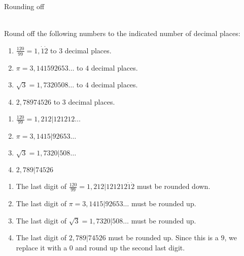 \begin{wex}{Rounding off }

{
\begin{minipage}{\textwidth}\\
Round off the following numbers to the indicated number of decimal places: 
\begin{enumerate}[itemsep=5pt, label=\textbf{\arabic*}. ] 

\item $\frac{120}{99}=1,\dot{1}\dot{2}$ to $3$ decimal places.
\item $\pi =3,141592653\ldots$ to $4$ decimal places.
\item $\sqrt{3}=1,7320508\ldots$ to $4$ decimal places.
\item $2,78974526$ to $3$ decimal places.
\end{enumerate}
\end{minipage}
}
{
\begin{minipage}{\textwidth}
\vspace{1ex}
\begin{enumerate}[itemsep=5pt, label=\textbf{\arabic*}. ] 
\item $\frac{120}{99}=1,212|121212\ldots$
\item $\pi =3,1415|92653\ldots$
\item $\sqrt{3}=1,7320|508\ldots$
\item $2,789|74526$
\end{enumerate}
\end{minipage}
\begin{minipage}{\textwidth}
\vspace{1ex}
\begin{enumerate}[itemsep=5pt, label=\textbf{\arabic*}. ]
\item The last digit of $\frac{120}{99}=1,212|121212\dot{1}\dot{2}$  must be rounded down.
\item The last digit of $\pi =3,1415|92653\ldots$ must be rounded up.
\item The last digit of $\sqrt{3}=1,7320|508\ldots$ must be rounded up.
\item  The last digit of $2,789|74526$ must be rounded up.
\newline Since this is a $9$, we replace it with a $0$ and round up the second last digit.


\end{enumerate}
\end{minipage}}
\end{wex}

